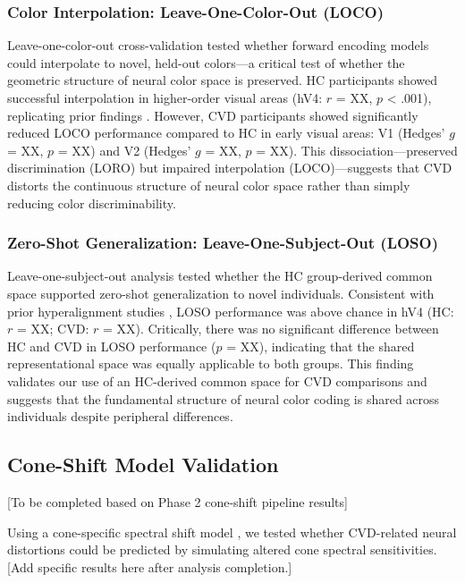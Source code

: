 \subsubsection{Color Interpolation: Leave-One-Color-Out (LOCO)}

Leave-one-color-out cross-validation tested whether forward encoding models could interpolate to novel, held-out colors---a critical test of whether the geometric structure of neural color space is preserved. HC participants showed successful interpolation in higher-order visual areas (hV4: $r$ = XX, $p$ < .001), replicating prior findings \cite{brouwer2009}. However, CVD participants showed significantly reduced LOCO performance compared to HC in early visual areas: V1 (Hedges' $g$ = XX, $p$ = XX) and V2 (Hedges' $g$ = XX, $p$ = XX). This dissociation---preserved discrimination (LORO) but impaired interpolation (LOCO)---suggests that CVD distorts the continuous structure of neural color space rather than simply reducing color discriminability.

\subsubsection{Zero-Shot Generalization: Leave-One-Subject-Out (LOSO)}

Leave-one-subject-out analysis tested whether the HC group-derived common space \cite{chen2015} supported zero-shot generalization to novel individuals. Consistent with prior hyperalignment studies \cite{haxby2011, guntupalli2016}, LOSO performance was above chance in hV4 (HC: $r$ = XX; CVD: $r$ = XX). Critically, there was no significant difference between HC and CVD in LOSO performance ($p$ = XX), indicating that the shared representational space was equally applicable to both groups. This finding validates our use of an HC-derived common space for CVD comparisons and suggests that the fundamental structure of neural color coding is shared across individuals despite peripheral differences.


\subsection{Cone-Shift Model Validation}

[To be completed based on Phase 2 cone-shift pipeline results]

Using a cone-specific spectral shift model \cite{brettel1997}, we tested whether CVD-related neural distortions could be predicted by simulating altered cone spectral sensitivities. [Add specific results here after analysis completion.]

